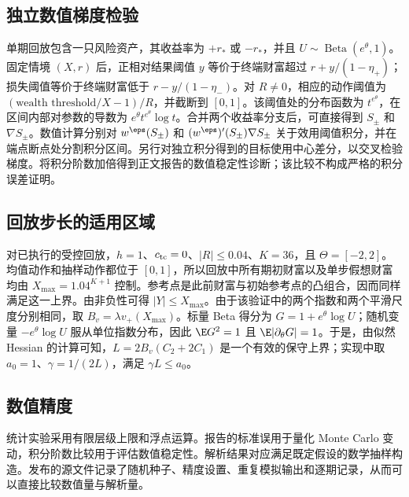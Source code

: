 \subsection{独立数值梯度检验}
单期回放包含一只风险资产，其收益率为 $+r_*$ 或 $-r_*$，并且 $U\sim\operatorname{Beta}(e^\theta,1)$。固定情境 $(X,r)$ 后，正相对结果阈值 $y$ 等价于终端财富超过 $r+y/(1-\eta_+)$；损失阈值等价于终端财富低于 $r-y/(1-\eta_-)$。对 $R\ne0$，相应的动作阈值为 $(\text{wealth threshold}/X-1)/R$，并截断到 $[0,1]$。该阈值处的分布函数为 $t^{e^\theta}$，在区间内部对参数的导数为 $e^\theta t^{e^\theta}\log t$。合并两个收益率分支后，可直接得到 $S_\pm$ 和 $\nabla S_\pm$。数值计算分别对 $w^\eps(S_\pm)$ 和 $(w^\eps)'(S_\pm)\nabla S_\pm$ 关于效用阈值积分，并在端点断点处分割积分区间。另行对独立积分得到的目标使用中心差分，以交叉检验梯度。将积分阶数加倍得到正文报告的数值稳定性诊断；该比较不构成严格的积分误差证明。

\subsection{回放步长的适用区域}
对已执行的受控回放，$h=1$、$c_{\rm tc}=0$、$|R|\le0.04$、$K=36$，且 $\Theta=[-2,2]$。均值动作和抽样动作都位于 $[0,1]$，所以回放中所有期初财富以及单步假想财富均由 $X_{\max}=1.04^{K+1}$ 控制。参考点是此前财富与初始参考点的凸组合，因而同样满足这一上界。由非负性可得 $|Y|\le X_{\max}$。由于该验证中的两个指数和两个平滑尺度分别相同，取 $B_v=\lambda v_+(X_{\max})$。标量 Beta 得分为 $G=1+e^\theta\log U$；随机变量 $-e^\theta\log U$ 服从单位指数分布，因此 $\E G^2=1$ 且 $\E|\partial_\theta G|=1$。于是，由似然 Hessian 的计算可知，$L=2B_v(C_2+2C_1)$ 是一个有效的保守上界；实现中取 $a_0=1$、$\gamma=1/(2L)$，满足 $\gamma L\le a_0$。

\subsection{数值精度}
统计实验采用有限层级上限和浮点运算。报告的标准误用于量化 Monte Carlo 变动，积分阶数比较用于评估数值稳定性。解析结果对应满足既定假设的数学抽样构造。发布的源文件记录了随机种子、精度设置、重复模拟输出和逐期记录，从而可以直接比较数值量与解析量。

